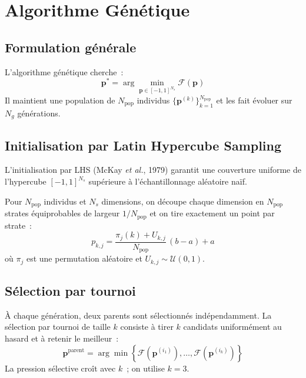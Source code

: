 \documentclass[12pt,a4paper]{article}
\numberwithin{equation}{section}
\numberwithin{figure}{section}
\numberwithin{table}{section}
\begin{document}
\section{Algorithme Génétique}

\subsection{Formulation générale}

L'algorithme génétique cherche~:
\begin{equation}
    \bm{p}^* = \arg\min_{\bm{p} \in [-1,1]^{N_s}} \mathcal{F}(\bm{p})
    \label{eq:opt_problem}
\end{equation}
Il maintient une population de $N_{\text{pop}}$ individus
$\{\bm{p}^{(k)}\}_{k=1}^{N_{\text{pop}}}$ et les fait évoluer sur $N_g$ générations.

\subsection{Initialisation par Latin Hypercube Sampling}

L'initialisation par LHS (McKay \textit{et al.}, 1979) garantit une
couverture uniforme de l'hypercube $[-1,1]^{N_s}$ supérieure à
l'échantillonnage aléatoire naïf.

Pour $N_{\text{pop}}$ individus et $N_s$ dimensions, on découpe chaque
dimension en $N_{\text{pop}}$ strates équiprobables de largeur $1/N_{\text{pop}}$
et on tire exactement un point par strate~:
\begin{equation}
    p_{k,j} = \frac{\pi_j(k) + U_{k,j}}{N_{\text{pop}}}\,(b-a) + a
    \label{eq:LHS}
\end{equation}
où $\pi_j$ est une permutation aléatoire et $U_{k,j} \sim \mathcal{U}(0,1)$.

\subsection{Sélection par tournoi}

À chaque génération, deux parents sont sélectionnés indépendamment.
La sélection par tournoi de taille $k$ consiste à tirer $k$ candidats
uniformément au hasard et à retenir le meilleur~:
\begin{equation}
    \bm{p}^{\text{parent}} = \arg\min\left\{\mathcal{F}(\bm{p}^{(i_1)}),
    \dots, \mathcal{F}(\bm{p}^{(i_k)})\right\}
    \label{eq:tournament}
\end{equation}
La pression sélective croît avec $k$~; on utilise $k=3$.
\end{document}
